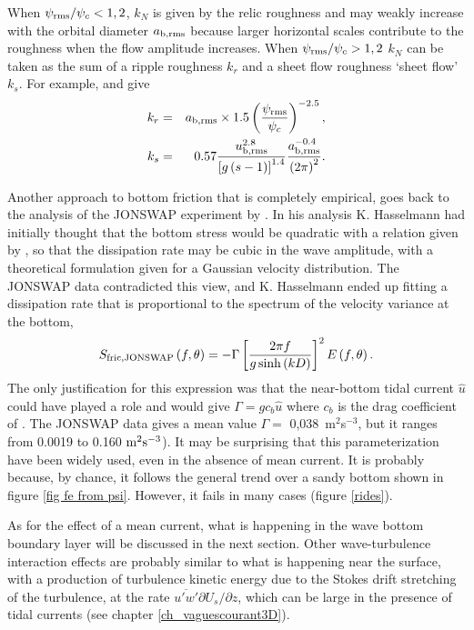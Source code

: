 When  $\psi_{\rm rms} /\psi _{c}<1,2$, $k_{N}$ is given by the relic roughness and may weakly increase with 
the orbital diameter  $a_{\rm b,rms}$ because larger horizontal scales contribute to the roughness when the flow 
amplitude increases. When  $\psi_{\rm rms} /\psi _{c}>1,2$ $k_N$
can be taken as the sum of a ripple roughness $k_r$ and a sheet flow roughness
`sheet flow' $k_s$. For example, 
 \cite{Madsen&al.1990} and \cite{Wilson1989} give
\label{krandks}
\begin{eqnarray}
k_{r} &=&a_{\rm b,rms}\times 1.5\left( \frac{\psi_{\rm rms}}{\psi _{c}}\right) ^{-2.5},
 \label{kr} \\
k_{s} &=&0.57\frac{u_{\rm b,rms}^{2.8}}{\left[ g\left( s-1\right) \right] ^{1.4}}%
\frac{a_{\rm b,rms}^{-0.4}}{\left( 2\upi \right) ^{2}}.    \label{ks}
\end{eqnarray}

Another approach to bottom friction that is completely empirical, goes back to the analysis of the JONSWAP experiment 
by \cite{JONSWAP}. In his analysis K. Hasselmann had initially thought that the bottom stress would be quadratic 
with a relation given by \cite{Hasselmann&Collins1968}, so that the dissipation rate may be cubic in the wave amplitude, with a theoretical formulation given for a Gaussian velocity distribution. The JONSWAP data 
contradicted this view, and  K. Hasselmann ended up fitting a dissipation rate that is proportional to the spectrum of 
the velocity variance at the bottom,
\begin{equation}
S_{\mathrm{fric,JONSWAP}}\left(f,\theta\right) =-\Gamma \left[ \frac{2\upi f}{%
g\sinh \left( kD\right) }\right] ^{2}E\left(f,\theta\right).  \label{JONSWAP}
\end{equation}
The only justification for this expression was that the near-bottom tidal current $\widehat{u}$ could have played a role
and would give $\Gamma = g c_b \widehat{u}$ where $c_b$ is the drag coefficient of \cite{Hasselmann&Collins1968}. The JONSWAP data gives a mean value $\Gamma =$ 0,038~m$^{2}$s$^{-3}$, but it ranges from 0.0019 to 0.160 ${\rm
m}^{2}{\rm s}^{-3}$). 
It may be surprising that this parameterization have been widely used, even in the absence of mean current. It is probably because, 
by chance, it follows the general trend over a sandy bottom shown in figure \ref{fig fe from psi}. However, it fails in many cases  (figure \ref{rides}).

As for the effect of a mean current, what is happening in the wave bottom boundary layer will be discussed in the next section. Other wave-turbulence interaction effects 
are probably similar to what is happening near the surface, with a production of turbulence kinetic energy due to the Stokes drift 
stretching of the turbulence, at the rate $\overline{u'w'}\partial U_s /\partial z$, which can be large in the presence of tidal currents (see chapter \ref{ch_vaguescourant3D}).

